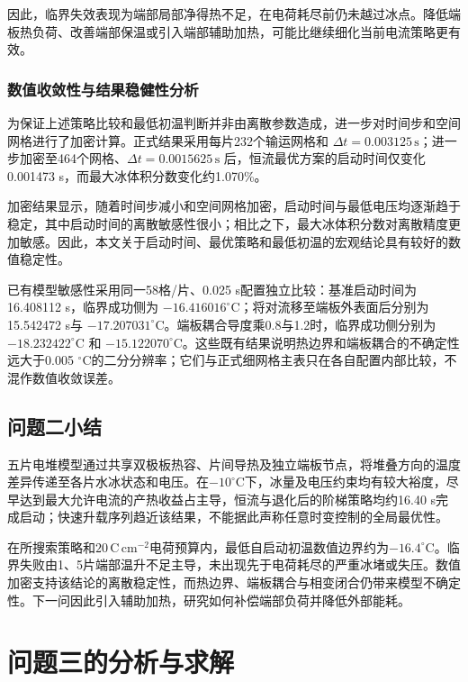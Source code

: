 \documentclass[bwprint]{gmcmthesis}
\numberwithin{equation}{section}
\numberwithin{figure}{section}
\begin{document}
因此，临界失效表现为端部局部净得热不足，在电荷耗尽前仍未越过冰点。降低端板热负荷、改善端部保温或引入端部辅助加热，可能比继续细化当前电流策略更有效。

\subsubsection{数值收敛性与结果稳健性分析}
为保证上述策略比较和最低初温判断并非由离散参数造成，进一步对时间步和空间网格进行了加密计算。正式结果采用每片232个输运网格和
\(\Delta t=0.003125\,\mathrm s\)；进一步加密至464个网格、\(\Delta t=0.0015625\,\mathrm s\) 后，恒流最优方案的启动时间仅变化0.001473 s，而最大冰体积分数变化约1.070\%。

加密结果显示，随着时间步减小和空间网格加密，启动时间与最低电压均逐渐趋于稳定，其中启动时间的离散敏感性很小；相比之下，最大冰体积分数对离散精度更加敏感。因此，本文关于启动时间、最优策略和最低初温的宏观结论具有较好的数值稳定性。


已有模型敏感性采用同一58格/片、0.025 s配置独立比较：基准启动时间为16.408112 s，临界成功侧为 $-16.416016^\circ\mathrm C$；将对流移至端板外表面后分别为15.542472 s与 $-17.207031^\circ\mathrm C$。端板耦合导度乘0.8与1.2时，临界成功侧分别为 $-18.232422^\circ\mathrm C$ 和 $-15.122070^\circ\mathrm C$。这些既有结果说明热边界和端板耦合的不确定性远大于0.005 $^\circ\mathrm C$的二分分辨率；它们与正式细网格主表只在各自配置内部比较，不混作数值收敛误差。

\subsection{问题二小结}
\begin{samepage}
五片电堆模型通过共享双极板热容、片间导热及独立端板节点，将堆叠方向的温度差异传递至各片水冰状态和电压。在$-10^\circ\mathrm C$下，冰量及电压约束均有较大裕度，尽早达到最大允许电流的产热收益占主导，恒流与退化后的阶梯策略均约16.40 s完成启动；快速升载序列趋近该结果，不能据此声称任意时变控制的全局最优性。\par
\end{samepage}

在所搜索策略和$20\,\mathrm{C\,cm^{-2}}$电荷预算内，最低自启动初温数值边界约为$-16.4^\circ\mathrm C$。临界失败由1、5片端部温升不足主导，未出现先于电荷耗尽的严重冰堵或失压。数值加密支持该结论的离散稳定性，而热边界、端板耦合与相变闭合仍带来模型不确定性。下一问因此引入辅助加热，研究如何补偿端部负荷并降低外部能耗。

\section{问题三的分析与求解}
\end{document}
